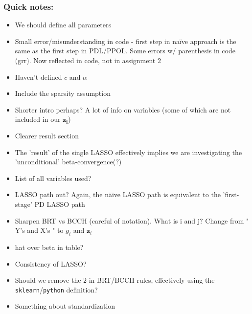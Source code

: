\documentclass[11pt]{article}
\begin{document}
\subsubsection*{Quick notes:} 
\begin{itemize}
    \item We should define all parameters
    \item Small error/misunderstanding in code - first step in naïve approach is the same as the first step in PDL/PPOL. Some errors w/ parenthesis in code (grr). Now reflected in code, not in assignment 2
    \item Haven't defined $c$ and $\alpha$
    \item Include the sparsity assumption
    \item Shorter intro perhaps? A lot of info on variables (some of which are not included in our $\mathbf{z_i}$)
    \item Clearer result section
    \item The 'result' of the single LASSO effectively implies we are investigating the 'unconditional' beta-convergence(?)
    \item List of all variables used?
    \item LASSO path out? Again, the näive LASSO path is equivalent to the 'first-stage' PD LASSO path
    \item Sharpen BRT vs BCCH (careful of notation). What is i and j? Change from " Y's and X's " to $g_i$ and $\mathbf{z}_i$
    \item hat over beta in table?
    \item Consistency of LASSO?
    \item Should we remove the $2$ in BRT/BCCH-rules, effectively using the \texttt{sklearn}/\texttt{python} definition?
    \item Something about standardization
\end{itemize}


\newpage
\begin{small}

\end{small}
\end{document}
